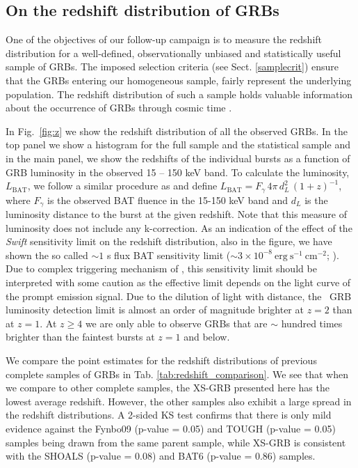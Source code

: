 \documentclass{aa}    %
\begin{document}
\subsection{On the redshift distribution of GRBs} \label{redshift}

One of the objectives of our follow-up campaign is to measure the redshift
distribution for a well-defined, observationally unbiased and statistically useful
sample of GRBs. The imposed selection criteria (see Sect. \ref{samplecrit})
ensure that the GRBs entering our homogeneous sample, fairly represent the
underlying population. The redshift distribution of such a sample holds valuable
information about the occurrence of GRBs through cosmic time
\citep{Jakobsson2012, Perley2016a}.



In Fig.~\ref{fig:z} we show the redshift distribution of all  the observed GRBs.
In the top panel we show a histogram for the full sample and the statistical
sample and in the main panel, we show the redshifts of the individual bursts as
a function of GRB luminosity in the observed 15 -- 150 keV band. To calculate the
luminosity, $L_{\mathrm{BAT}}$, we follow a similar procedure as
\citet{Lien2016} and define $L_{\mathrm{BAT}} = F_{\gamma}\,4
\pi\,d_L^2\,(1+z)^{-1}$, where $F_{\gamma}$ is the observed BAT fluence in the
15-150 keV band and $d_L$ is the luminosity distance to the burst at the given
redshift. Note that this measure of luminosity does not include any
k-correction. As an indication of the effect of the \textit{Swift} sensitivity
limit on the redshift distribution, also in the figure, we have shown the so
called $\sim 1$ s flux BAT sensitivity limit ($\sim 3 \times
10^{-8}~\mathrm{erg}~\mathrm{s}^{-1}~\mathrm{cm}^{-2}$;
\citealt{Baumgartner2013, Lien2016}). Due to complex triggering mechanism of
\swift, this sensitivity limit should be interpreted with some caution as the
effective limit depends on the light curve of the prompt emission signal. Due to
the dilution of light with distance, the \swift~GRB luminosity detection limit
is almost an order of magnitude brighter at $z=2$ than at $z=1$. At $z\geq4$
we are only able to observe GRBs that are $\sim$ hundred times brighter than the
faintest bursts at $z=1$ and below.

We compare the point estimates for the redshift distributions of previous
complete samples of GRBs in Tab. \ref{tab:redshift_comparison}. We see that when
we compare to other complete samples, the XS-GRB presented here has the lowest
average redshift. However, the other samples also exhibit a large spread in the
redshift distributions. A 2-sided KS test confirms that there is only mild
evidence against the Fynbo09 (p-value = 0.05) and TOUGH (p-value = 0.05) samples
being drawn from the same parent sample, while XS-GRB is consistent with the
SHOALS (p-value = 0.08) and BAT6 (p-value = 0.86) samples.
\end{document}
